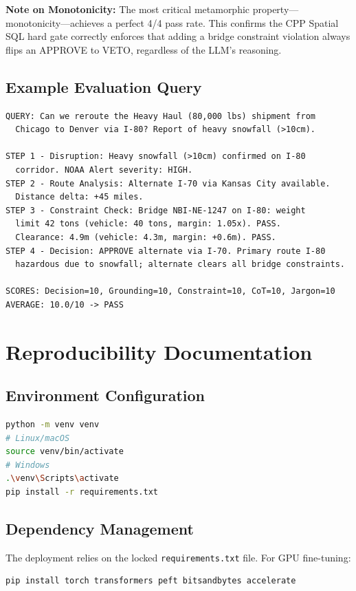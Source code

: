 \documentclass[11pt,letterpaper]{article}
\begin{document}
\textbf{Note on Monotonicity:} The most critical metamorphic property---monotonicity---achieves a perfect 4/4 pass rate. This confirms the CPP Spatial SQL hard gate correctly enforces that adding a bridge constraint violation always flips an APPROVE to VETO, regardless of the LLM's reasoning.

\subsection{Example Evaluation Query}
\begin{lstlisting}[caption={Example evaluation query and model response}]
QUERY: Can we reroute the Heavy Haul (80,000 lbs) shipment from
  Chicago to Denver via I-80? Report of heavy snowfall (>10cm).

STEP 1 - Disruption: Heavy snowfall (>10cm) confirmed on I-80
  corridor. NOAA Alert severity: HIGH.
STEP 2 - Route Analysis: Alternate I-70 via Kansas City available.
  Distance delta: +45 miles.
STEP 3 - Constraint Check: Bridge NBI-NE-1247 on I-80: weight
  limit 42 tons (vehicle: 40 tons, margin: 1.05x). PASS.
  Clearance: 4.9m (vehicle: 4.3m, margin: +0.6m). PASS.
STEP 4 - Decision: APPROVE alternate via I-70. Primary route I-80
  hazardous due to snowfall; alternate clears all bridge constraints.

SCORES: Decision=10, Grounding=10, Constraint=10, CoT=10, Jargon=10
AVERAGE: 10.0/10 -> PASS
\end{lstlisting}

\section{Reproducibility Documentation}

\subsection{Environment Configuration}
\begin{lstlisting}[language=bash]
python -m venv venv
# Linux/macOS
source venv/bin/activate
# Windows
.\venv\Scripts\activate
pip install -r requirements.txt
\end{lstlisting}

\subsection{Dependency Management}
The deployment relies on the locked \texttt{requirements.txt} file. For GPU fine-tuning:
\begin{lstlisting}[language=bash]
pip install torch transformers peft bitsandbytes accelerate
\end{lstlisting}
\end{document}
